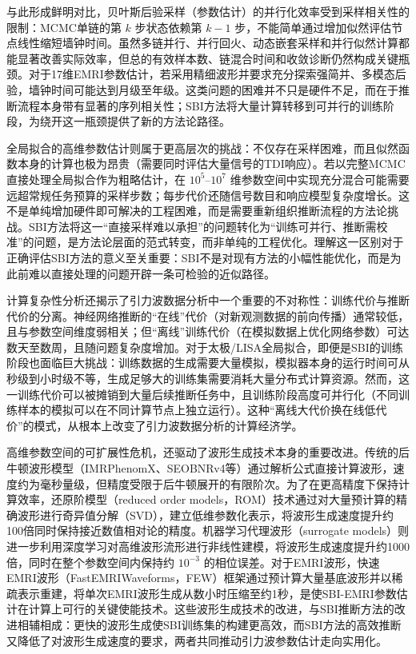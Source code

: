 与此形成鲜明对比，贝叶斯后验采样（参数估计）的并行化效率受到采样相关性的限制：MCMC单链的第 $k$ 步状态依赖第 $k-1$ 步，不能简单通过增加似然评估节点线性缩短墙钟时间。虽然多链并行、并行回火、动态嵌套采样和并行似然计算都能显著改善实际效率，但总的有效样本数、链混合时间和收敛诊断仍然构成关键瓶颈。对于17维EMRI参数估计，若采用精细波形并要求充分探索强简并、多模态后验，墙钟时间可能达到月级至年级。这类问题的困难并不只是硬件不足，而在于推断流程本身带有显著的序列相关性；SBI方法将大量计算转移到可并行的训练阶段，为绕开这一瓶颈提供了新的方法论路径。

全局拟合的高维参数估计则属于更高层次的挑战：不仅存在采样困难，而且似然函数本身的计算也极为昂贵（需要同时评估大量信号的TDI响应）。若以完整MCMC直接处理全局拟合作为粗略估计，在 $10^5$--$10^7$ 维参数空间中实现充分混合可能需要远超常规任务预算的采样步数；每步代价还随信号数目和响应模型复杂度增长。这不是单纯增加硬件即可解决的工程困难，而是需要重新组织推断流程的方法论挑战。SBI方法将这一“直接采样难以承担”的问题转化为“训练可并行、推断需校准”的问题，是方法论层面的范式转变，而非单纯的工程优化。理解这一区别对于正确评估SBI方法的意义至关重要：SBI不是对现有方法的小幅性能优化，而是为此前难以直接处理的问题开辟一条可检验的近似路径。

计算复杂性分析还揭示了引力波数据分析中一个重要的不对称性：训练代价与推断代价的分离。神经网络推断的“在线”代价（对新观测数据的前向传播）通常较低，且与参数空间维度弱相关；但“离线”训练代价（在模拟数据上优化网络参数）可达数天至数周，且随问题复杂度增加。对于太极/LISA全局拟合，即便是SBI的训练阶段也面临巨大挑战：训练数据的生成需要大量模拟，模拟器本身的运行时间可从秒级到小时级不等，生成足够大的训练集需要消耗大量分布式计算资源。然而，这一训练代价可以被摊销到大量后续推断任务中，且训练阶段高度可并行化（不同训练样本的模拟可以在不同计算节点上独立运行）。这种“离线大代价换在线低代价”的模式，从根本上改变了引力波数据分析的计算经济学。

高维参数空间的可扩展性危机，还驱动了波形生成技术本身的重要改进。传统的后牛顿波形模型（IMRPhenomX、SEOBNRv4等）通过解析公式直接计算波形，速度约为毫秒量级，但精度受限于后牛顿展开的有限阶次。为了在更高精度下保持计算效率，还原阶模型（reduced order models，ROM）技术通过对大量预计算的精确波形进行奇异值分解（SVD），建立低维参数化表示，将波形生成速度提升约100倍同时保持接近数值相对论的精度。机器学习代理波形（surrogate models）则进一步利用深度学习对高维波形流形进行非线性建模，将波形生成速度提升约1000倍，同时在整个参数空间内保持约 $10^{-3}$ 的相位误差。对于EMRI波形，快速EMRI波形（FastEMRIWaveforms，FEW）框架通过预计算大量基底波形并以稀疏表示重建，将单次EMRI波形生成从数小时压缩至约1秒，是使SBI-EMRI参数估计在计算上可行的关键使能技术。这些波形生成技术的改进，与SBI推断方法的改进相辅相成：更快的波形生成使SBI训练集的构建更高效，而SBI方法的高效推断又降低了对波形生成速度的要求，两者共同推动引力波参数估计走向实用化。

